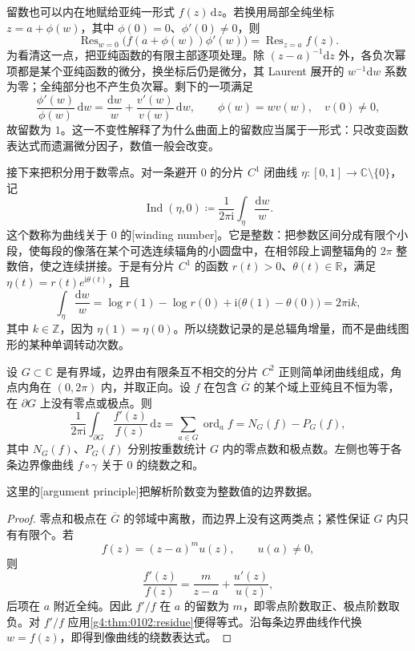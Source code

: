 留数也可以内在地赋给亚纯一形式 \(f(z)\,\mathrm{d}z\)。若换用局部全纯坐标 \(z=a+\phi(w)\)，其中 \(\phi(0)=0\)、\(\phi'(0)\neq0\)，则
\[
	\operatorname{Res}_{w=0}\bigl(f(a+\phi(w))\phi'(w)\bigr)
	=\operatorname{Res}_{z=a}f(z).
\]
为看清这一点，把亚纯函数的有限主部逐项处理。除 \((z-a)^{-1}\mathrm{d}z\) 外，各负次幂项都是某个亚纯函数的微分，换坐标后仍是微分，其 Laurent 展开的 \(w^{-1}\mathrm{d}w\) 系数为零；全纯部分也不产生负次幂。剩下的一项满足
\[
	\frac{\phi'(w)}{\phi(w)}\,\mathrm{d}w
	=\frac{\mathrm{d}w}{w}+\frac{v'(w)}{v(w)}\,\mathrm{d}w,
	\qquad \phi(w)=wv(w),\quad v(0)\neq0,
\]
故留数为 \(1\)。这一不变性解释了为什么曲面上的留数应当属于一形式：只改变函数表达式而遗漏微分因子，数值一般会改变。

\ProseParagraphBreak

接下来把积分用于数零点。对一条避开 \(0\) 的分片 \(C^1\) 闭曲线 \(\eta:[0,1]\rightarrow\mathbb C\setminus\{0\}\)，记
\[
	\operatorname{Ind}(\eta,0)
	\coloneqq\frac{1}{2\pi\mathrm{i}}\int_\eta\frac{\mathrm{d}w}{w}.
\]
这个数称为曲线关于 \(0\) 的[winding number]。它是整数：把参数区间分成有限个小段，使每段的像落在某个可选连续辐角的小圆盘中，在相邻段上调整辐角的 \(2\pi\) 整数倍，使之连续拼接。于是有分片 \(C^1\) 的函数 \(r(t)>0\)、\(\theta(t)\in\mathbb R\)，满足 \(\eta(t)=r(t)e^{\mathrm{i}\theta(t)}\)，且
\[
	\int_\eta\frac{\mathrm{d}w}{w}
	=\log r(1)-\log r(0)+\mathrm{i}\bigl(\theta(1)-\theta(0)\bigr)
	=2\pi\mathrm{i}k,
\]
其中 \(k\in\mathbb Z\)，因为 \(\eta(1)=\eta(0)\)。所以绕数记录的是总辐角增量，而不是曲线图形的某种单调转动次数。

\begin{theorem}[辐角原理]\label{g4:thm:0102:argument}
	设 \(G\subset\mathbb C\) 是有界域，边界由有限条互不相交的分片 \(C^2\) 正则简单闭曲线组成，角点内角在 \((0,2\pi)\) 内，并取正向。设 \(f\) 在包含 \(\overline G\) 的某个域上亚纯且不恒为零，在 \(\partial G\) 上没有零点或极点。则
	\[
		\frac{1}{2\pi\mathrm{i}}\int_{\partial G}\frac{f'(z)}{f(z)}\,\mathrm{d}z
		=\sum_{a\in G}\operatorname{ord}_a f
		=N_G(f)-P_G(f),
	\]
	其中 \(N_G(f)\)、\(P_G(f)\) 分别按重数统计 \(G\) 内的零点数和极点数。左侧也等于各条边界像曲线 \(f\circ\gamma\) 关于 \(0\) 的绕数之和。
\end{theorem}
这里的[argument principle]把解析阶数变为整数值的边界数据。
\begin{proof}
	零点和极点在 \(\overline G\) 的邻域中离散，而边界上没有这两类点；紧性保证 \(G\) 内只有有限个。若
	\[
		f(z)=(z-a)^m u(z),\qquad u(a)\neq0,
	\]
	则
	\[
		\frac{f'(z)}{f(z)}=\frac{m}{z-a}+\frac{u'(z)}{u(z)},
	\]
	后项在 \(a\) 附近全纯。因此 \(f'/f\) 在 \(a\) 的留数为 \(m\)，即零点阶数取正、极点阶数取负。对 \(f'/f\) 应用\cref{g4:thm:0102:residue}便得等式。沿每条边界曲线作代换 \(w=f(z)\)，即得到像曲线的绕数表达式。
\end{proof}

